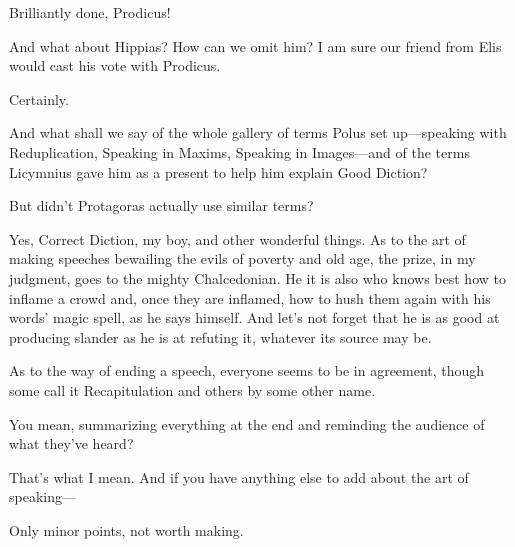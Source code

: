 \sayphaedrus Brilliantly done, Prodicus!

\saysocrates And what about
Hippias? How can we
omit him? I am sure our friend from Elis would cast his vote with
Prodicus.

\sayphaedrus Certainly.

\saysocrates And what shall we say of the whole gallery of terms
Polus set
up---speaking with Reduplication, Speaking in Maxims, Speaking in
Images---and of the terms Licymnius gave him as a present to help him
explain Good Diction?

\sayphaedrus But didn’t Protagoras actually use similar
terms?

\saysocrates Yes, Correct Diction, my boy, and other wonderful things. As
to the art of making speeches bewailing the evils of poverty and old
age, the prize, in my judgment, goes to the mighty
Chalcedonian. He it is
also who knows best how to inflame a crowd and, once they are
inflamed, how to hush them again with his words’ magic spell, as he says
himself. And let’s not forget that he is as good at producing slander as
he is at refuting it, whatever its source may be.

As to the way of ending a speech, everyone seems to be in agreement,
though some call it Recapitulation and others by some other name.

\sayphaedrus You mean, summarizing everything at the end and reminding the
audience of what they’ve heard?

\saysocrates That’s what I mean. And if you have anything else to add about
the art of speaking---

\sayphaedrus Only minor points, not worth making.

